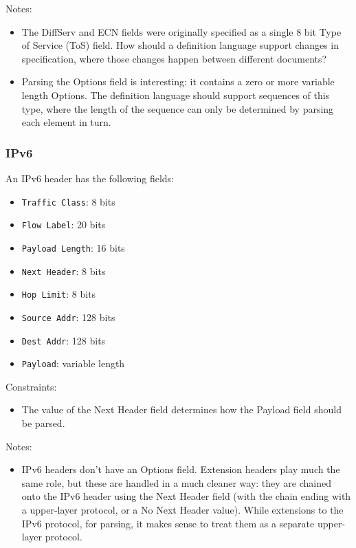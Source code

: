 \documentclass[10pt]{article}
\begin{document}
Notes:
\begin{itemize}
\item The DiffServ and ECN fields were originally specified as a single 8 bit 
Type of Service (ToS) field. How should a definition language support changes in
specification, where those changes happen between different documents?
\item Parsing the Options field is interesting: it contains a zero or more variable
length Options. The definition language should support sequences of this type, where the
length of the sequence can only be determined by parsing each element in turn.
\end{itemize}

\subsubsection{IPv6}

An IPv6 header has the following fields:
\begin{itemize}
\item \texttt{Traffic Class}: 8 bits
\item \texttt{Flow Label}: 20 bits
\item \texttt{Payload Length}: 16 bits
\item \texttt{Next Header}: 8 bits
\item \texttt{Hop Limit}: 8 bits
\item \texttt{Source Addr}: 128 bits
\item \texttt{Dest Addr}: 128 bits
\item \texttt{Payload}: variable length
\end{itemize}

Constraints:
\begin{itemize}
\item The value of the Next Header field determines how the Payload field should be parsed.
\end{itemize}

Notes:
\begin{itemize}
\item IPv6 headers don't have an Options field. Extension headers play much the same role,
but these are handled in a much cleaner way: they are chained onto the IPv6 header using
the Next Header field (with the chain ending with a upper-layer protocol, or a No Next
Header value). While extensions to the IPv6 protocol, for parsing, it makes sense to treat
them as a separate upper-layer protocol.
\end{itemize}
\end{document}
